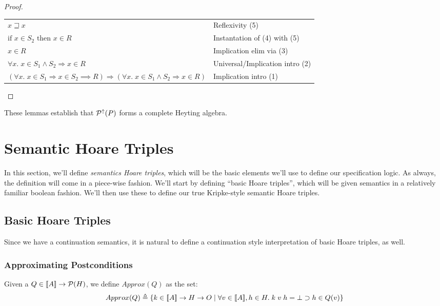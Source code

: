 \begin{proof}
\begin{tabular}{ll}
$x \sqsupseteq x$ & 
Reflexivity (5) \\

$\mbox{if } x \in S_2 \mbox{ then } x \in R$ & 
Instantation of (4) with (5) \\

$x \in R$ & 
Implication elim via (3) \\

$\forall x.\; x \in S_1 \land S_2 \Rightarrow x \in R$ & 
Universal/Implication intro (2) \\

$(\forall x.\; x \in S_1 \Rightarrow x \in S_2 \implies R) \Rightarrow (\forall x.\; x \in S_1 \land S_2 \Rightarrow x \in R)$ & 
Implication intro (1) \\
\end{tabular}
\end{proof}

These lemmas establish that $\mathcal{P}^{\uparrow}({P})$ forms a complete Heyting algebra. 

\section{Semantic Hoare Triples}

In this section, we'll define \emph{semantics Hoare triples}, which will be the basic
elements we'll use to define our specification logic. As always, the definition
will come in a piece-wise fashion. We'll start by defining ``basic Hoare triples'',
which will be given semantics in a relatively familiar boolean fashion. We'll then
use these to define our true Kripke-style semantic Hoare triples. 

\subsection{Basic Hoare Triples}

Since we have a continuation semantics, it is natural to define a
continuation style interpretation of basic Hoare triples, as well.

\subsubsection{Approximating Postconditions}

Given a $Q \in [\![{A}]\!] \to \mathcal{P}(H)$, we define $Approx(Q)$ as the set:
\begin{displaymath}
  Approx(Q) \triangleq \{{{k \in [\![{A}]\!] \to H \to O}\;|\;{\forall v \in [\![{A}]\!], h \in H.\; 
                            k\;v\;h = \bot \supset h \in Q(v)}}\}
\end{displaymath}

